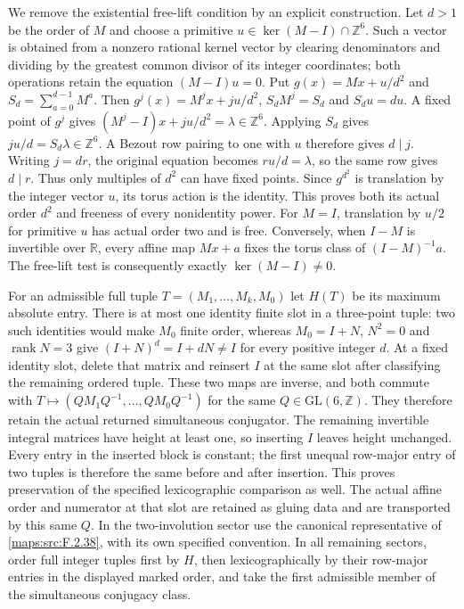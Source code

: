 \item We remove the existential free-lift condition by an explicit
construction. Let $d>1$ be the order of $M$ and choose a primitive
$u\in\ker(M-I)\cap\mathbb Z^6$. Such a vector is obtained from a
nonzero rational kernel vector by clearing denominators and dividing
by the greatest common divisor of its integer coordinates; both
operations retain the equation $(M-I)u=0$. Put
$g(x)=Mx+u/d^2$ and $S_d=\sum_{a=0}^{d-1}M^a$.
Then $g^j(x)=M^jx+ju/d^2$, $S_dM^j=S_d$ and $S_du=du$.
A fixed point of $g^j$ gives
$(M^j-I)x+ju/d^2=\lambda\in\mathbb Z^6$.
Applying $S_d$ gives $ju/d=S_d\lambda\in\mathbb Z^6$.
A Bezout row pairing to one with $u$ therefore gives $d\mid j$.
Writing $j=dr$, the original equation becomes $ru/d=\lambda$,
so the same row gives $d\mid r$. Thus only multiples of $d^2$
can have fixed points. Since $g^{d^2}$ is translation by the
integer vector $u$, its torus action is the identity. This proves
both its actual order $d^2$ and freeness of every nonidentity power.
For $M=I$, translation by $u/2$ for primitive $u$ has actual order
two and is free. Conversely, when $I-M$ is invertible over
$\mathbb R$, every affine map $Mx+a$ fixes the torus class of
$(I-M)^{-1}a$. The free-lift test is consequently exactly
$\ker(M-I)\ne0$.

\item For an admissible full tuple $T=(M_1,\ldots,M_k,M_0)$ let
$H(T)$ be its maximum absolute entry. There is at most one identity
finite slot in a three-point tuple: two such identities would make
$M_0$ finite order, whereas $M_0=I+N$, $N^2=0$ and
$\operatorname{rank}N=3$ give $(I+N)^d=I+dN\ne I$ for every
positive integer $d$. At a fixed identity slot, delete that matrix
and reinsert $I$ at the same slot after classifying the remaining
ordered tuple. These two maps are inverse, and both commute with
$T\mapsto (QM_1Q^{-1},\ldots,QM_0Q^{-1})$ for the same
$Q\in\mathrm{GL}(6,\mathbb Z)$. They therefore retain the actual
returned simultaneous conjugator. The remaining invertible integral
matrices have height at least one, so inserting $I$ leaves height
unchanged. Every entry in the inserted block is constant; the first
unequal row-major entry of two tuples is therefore the same before
and after insertion. This proves preservation of the specified
lexicographic comparison as well. The actual affine order and
numerator at that slot are retained as gluing data and are transported
by this same $Q$. In the two-involution sector use the canonical
representative of \ref{maps:src:F.2.38}, with its own specified
convention. In all remaining sectors, order full integer tuples
first by $H$, then lexicographically by their row-major entries in
the displayed marked order, and take the first admissible member
of the simultaneous conjugacy class.
